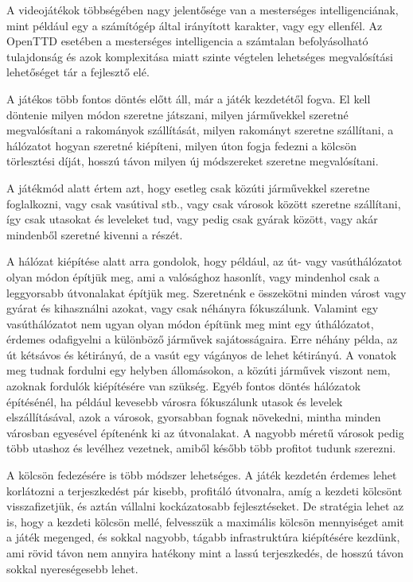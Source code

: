 A videojátékok többségében nagy jelentősége van a mesterséges intelligenciának, mint például egy a számítógép által irányított karakter, vagy egy ellenfél. Az OpenTTD esetében a mesterséges intelligencia a számtalan befolyásolható tulajdonság és azok komplexitása miatt szinte végtelen lehetséges megvalósítási lehetőséget tár a fejlesztő elé. 


A játékos több fontos döntés előtt áll, már a játék kezdetétől fogva. El kell döntenie milyen módon szeretne játszani, milyen járművekkel szeretné megvalósítani a rakományok szállítását, milyen rakományt szeretne szállítani, a hálózatot hogyan szeretné kiépíteni, milyen úton fogja fedezni a kölcsön törlesztési díját, hosszú távon milyen új módszereket szeretne megvalósítani.

A játékmód alatt értem azt, hogy esetleg csak közúti járművekkel szeretne foglalkozni, vagy csak vasútival stb., vagy csak városok között szeretne szállítani, így csak utasokat és leveleket tud, vagy pedig csak gyárak között, vagy akár mindenből szeretné kivenni a részét.

A hálózat kiépítése alatt arra gondolok, hogy például, az út- vagy vasúthálózatot olyan módon építjük meg, ami a valósághoz hasonlít, vagy mindenhol csak a leggyorsabb útvonalakat építjük meg. Szeretnénk e összekötni minden várost vagy gyárat és kihasználni azokat, vagy csak néhányra fókuszálunk. Valamint egy vasúthálózatot nem ugyan olyan módon építünk meg mint egy úthálózatot, érdemes odafigyelni a különböző járművek sajátosságaira. Erre néhány példa, az út kétsávos és kétirányú, de a vasút egy vágányos de lehet kétirányú. A vonatok meg tudnak fordulni egy helyben állomásokon, a közúti járművek viszont nem, azoknak fordulók kiépítésére van szükség. Egyéb fontos döntés hálózatok építésénél, ha például kevesebb városra fókuszálunk utasok és levelek elszállításával, azok a városok, gyorsabban fognak növekedni, mintha minden városban egyesével építenénk ki az útvonalakat. A nagyobb méretű városok pedig több utashoz és levélhez vezetnek, amiből később több profitot tudunk szerezni.

A kölcsön fedezésére is több módszer lehetséges. A játék kezdetén érdemes lehet korlátozni a terjeszkedést pár kisebb, profitáló útvonalra, amíg a kezdeti kölcsönt visszafizetjük, és aztán vállalni kockázatosabb fejlesztéseket. De stratégia lehet az is, hogy a kezdeti kölcsön mellé, felvesszük a maximális kölcsön mennyiséget amit a játék megenged, és sokkal nagyobb, tágabb infrastruktúra kiépítésére kezdünk, ami rövid távon nem annyira hatékony mint a lassú terjeszkedés, de hosszú távon sokkal nyereségesebb lehet.

